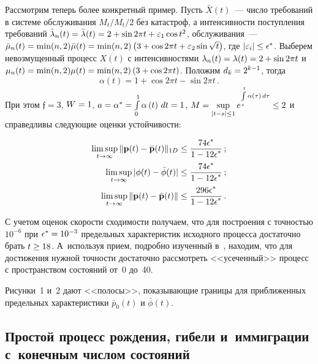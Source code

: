 \begin{multicols}{2}
Рассмотрим теперь более конкретный пример. Пусть $\bar{X}(t)$~---
чис\-ло требований в системе
обслуживания $M_t/M_t/2$ без катастроф, а интенсивности поступления требований
$\bar\lambda_n(t)\hm=  \bar\lambda(t) \hm= 2 \hm+
\sin 2\pi t \hm+ \varepsilon_1 \cos t^2$, обслуживания~---
$\bar\mu_n(t)\hm=\min(n,2)\bar\mu(t) \hm=
\min(n,2)\left(3\hm+\cos 2\pi t\hm+\varepsilon_2 \sin \sqrt{t}\right)$,
где $|\varepsilon_i| \hm\le \epsilon^*$.
Выберем невозмущенный процесс $X(t)$ с интенсивностями $\lambda_n(t)\hm=  \lambda(t) \hm= 2 \hm+
\sin 2\pi t$ и   $\mu_n(t)\hm=\min(n,2)\mu(t) \hm= \min(n,2)\left(3\hm+\cos 2\pi t\right)$.
Положим $d_k\hm= 2^{k-1}$, тогда
\begin{equation*}
\alpha\left( t\right) = 1 + \cos 2\pi t - \sin 2\pi t\,.
\end{equation*}
При этом $\mathfrak{f}= 3$, $W\hm=1$,  $a\hm = \alpha^* \hm=
\int\limits_0^{1}\alpha\left( t\right)\, dt \hm= 1$,
$M\hm = \sup\limits_{|t-s|\le 1} e^{\int\limits_s^{t}\alpha\left( \tau\right)\, d\tau} \hm\le 2$
и справедливы сле\-ду\-ющие оценки устойчивости:

\noindent
\begin{align*}
\limsup\limits_{t \to \infty}   \|{\bf p}(t)- {\bar{\bf p}}(t)\|_{1D} &\le
\displaystyle\frac{\displaystyle 74\epsilon^*\mathstrut}{\displaystyle 1 - 12\epsilon^*\mathstrut}\,;
\\
\limsup_{t \to \infty}  |\phi(t) - \bar{\phi}(t)|&\le
\displaystyle\frac{\displaystyle 74\epsilon^*\mathstrut}{\displaystyle 1 - 12\epsilon^*\mathstrut}\,;
\\
\limsup_{t \to \infty}   \|{\bf p}(t)- {\bar{\bf p}}(t)\| &\le
\displaystyle\frac{\displaystyle 296\epsilon^*\mathstrut}{\displaystyle 1 - 12\epsilon^*\mathstrut}\,.
\end{align*}

С учетом оценок скорости сходимости получаем, что для построения с точностью
$10^{-6}$ при $\epsilon^* \hm= 10^{-3}$ предельных характеристик исходного процесса
достаточно брать $t \hm\ge 18$. А~используя прием, подробно изученный в~\cite{z06},
находим, что для достижения нужной точности достаточно рассмотреть <<усеченный>>
процесс с  пространством состояний от~0 до~40.

Рисунки~1 и~2 дают <<полосы>>, показывающие границы для приближенных
предельных характеристики $\bar{p}_0(t)$ и $\bar{\phi}(t)$.


\vspace*{-5pt}

\subsection{Простой процесс рождения, гибели и~иммиграции с~конечным числом состояний}


\end{multicols}
